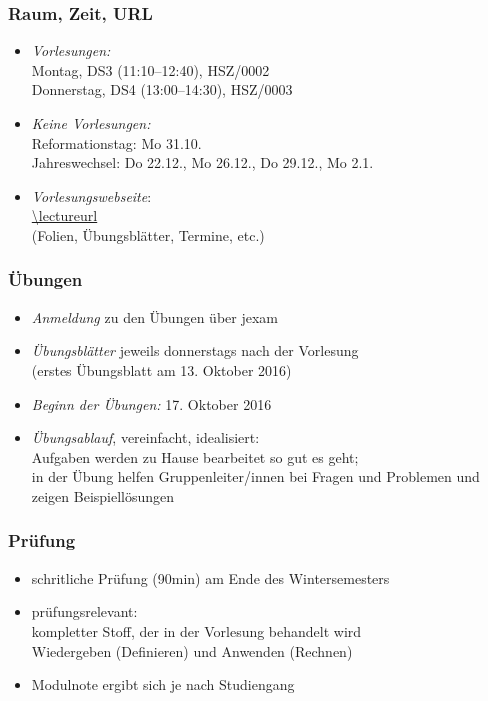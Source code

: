 \documentclass[onlymath]{beamer}
\begin{document}
\maketitle



\begin{frame}\frametitle{Raum, Zeit, URL}

\begin{itemize}
\item \emph{Vorlesungen:}\\
	Montag, DS3 (11:10--12:40), HSZ/0002\\
	Donnerstag, DS4 (13:00--14:30), HSZ/0003
\item \emph{Keine Vorlesungen:}\\
	Reformationstag: Mo 31.10.\\
	Jahreswechsel: Do 22.12., Mo 26.12., Do 29.12., Mo 2.1.
\item \emph{Vorlesungswebseite}:\\[1ex]
	\url{\lectureurl}\\[1ex]
	(Folien, Übungsblätter, Termine, etc.)
\end{itemize}

\end{frame}


\begin{frame}\frametitle{Übungen}
\begin{itemize}
\item \emph{Anmeldung} zu den Übungen über jexam
\item \emph{Übungsblätter} jeweils donnerstags nach der Vorlesung\\
	(erstes Übungsblatt am 13. Oktober 2016)
\item \emph{Beginn der Übungen:} 17. Oktober 2016
\item \emph{Übungsablauf}, vereinfacht, idealisiert:\\
	Aufgaben werden zu Hause bearbeitet so gut es geht;\\
	in der Übung helfen Gruppenleiter/innen bei Fragen und Problemen und zeigen Beispiellösungen\\[1ex]
\end{itemize}

\end{frame}


\begin{frame}\frametitle{Prüfung}
\begin{itemize}
\item schritliche Prüfung (90min) am Ende des Wintersemesters
\item prüfungsrelevant:\\
	kompletter Stoff, der in der Vorlesung behandelt wird\\
	Wiedergeben (Definieren) \alert{und} Anwenden (Rechnen)
\item Modulnote ergibt sich je nach Studiengang
\end{itemize}

\end{frame}
\end{document}
